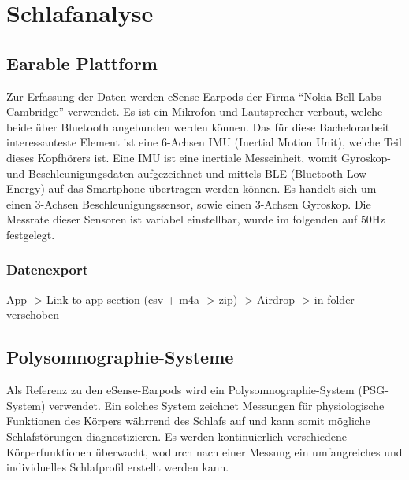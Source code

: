 
\chapter{Schlafanalyse}
\label{ch:Schlafanalyse}

\section{Earable Plattform}
Zur Erfassung der Daten werden eSense-Earpods der Firma ``Nokia Bell Labs Cambridge'' verwendet.	
Es ist ein Mikrofon und Lautsprecher verbaut, welche beide über Bluetooth angebunden werden können. 
Das für diese Bachelorarbeit interessanteste Element ist eine 6-Achsen IMU (Inertial Motion Unit), welche Teil dieses Kopfhörers ist.
Eine IMU ist eine inertiale Messeinheit, womit Gyroskop- und Beschleunigungsdaten aufgezeichnet und mittels BLE (Bluetooth Low Energy) auf das Smartphone übertragen werden können. 
Es handelt sich um einen 3-Achsen Beschleunigungssensor, sowie einen 3-Achsen Gyroskop.
Die Messrate dieser Sensoren ist variabel einstellbar, wurde im folgenden auf $50 \si{\hertz}$ festgelegt.





\subsection{Datenexport}
App -> Link to app section
(csv + m4a -> zip) -> Airdrop -> in folder verschoben

\section{Polysomnographie-Systeme}
Als Referenz zu den eSense-Earpods wird ein Polysomnographie-System (PSG-System) verwendet. 
Ein solches System zeichnet Messungen für physiologische Funktionen des Körpers währrend des Schlafs auf und kann somit mögliche Schlafstörungen diagnostizieren.
Es werden kontinuierlich verschiedene Körperfunktionen überwacht, wodurch nach einer Messung ein umfangreiches und individuelles Schlafprofil erstellt werden kann.

